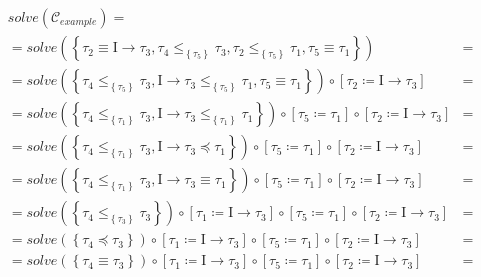 \begin{equation}
    \label{eq:consts_solve}
    \begin{aligned}
        &solve(\mathcal{C}_{example}) = \\
        &= solve(\left\{ \tau_2 \equiv \text{I} \to \tau_3, \tau_4 \leq_{\left\{ \tau_5 \right\}} \tau_3, \tau_2 \leq_{\left\{ \tau_5 \right\}} \tau_1, \tau_5 \equiv \tau_1 \right\}) &= \\
        &= solve(\left\{ \tau_4 \leq_{\left\{ \tau_5 \right\}} \tau_3, \text{I} \to \tau_3 \leq_{\left\{ \tau_5 \right\}} \tau_1, \tau_5 \equiv \tau_1 \right\}) \circ \left[ \tau_2 \coloneqq \text{I} \to \tau_3 \right] &= \\
        &= solve(\left\{ \tau_4 \leq_{\left\{ \tau_1 \right\}} \tau_3, \text{I} \to \tau_3 \leq_{\left\{ \tau_1 \right\}} \tau_1 \right\})                       \circ \left[ \tau_5 \coloneqq \tau_1 \right] \circ \left[ \tau_2 \coloneqq \text{I} \to \tau_3 \right] &= \\
        &= solve(\left\{ \tau_4 \leq_{\left\{ \tau_1 \right\}} \tau_3, \text{I} \to \tau_3 \preceq \tau_1 \right\})                                              \circ \left[ \tau_5 \coloneqq \tau_1 \right] \circ \left[ \tau_2 \coloneqq \text{I} \to \tau_3 \right] &= \\
        &= solve(\left\{ \tau_4 \leq_{\left\{ \tau_1 \right\}} \tau_3, \text{I} \to \tau_3 \equiv \tau_1 \right\})                                               \circ \left[ \tau_5 \coloneqq \tau_1 \right] \circ \left[ \tau_2 \coloneqq \text{I} \to \tau_3 \right] &= \\
        &= solve(\left\{ \tau_4 \leq_{\left\{ \tau_3 \right\}} \tau_3 \right\})                                                                                  \circ \left[ \tau_1 \coloneqq \text{I} \to \tau_3 \right] \circ \left[ \tau_5 \coloneqq \tau_1 \right] \circ \left[ \tau_2 \coloneqq \text{I} \to \tau_3 \right] &= \\
        &= solve(\left\{ \tau_4 \preceq \tau_3 \right\})                                                                                                         \circ \left[ \tau_1 \coloneqq \text{I} \to \tau_3 \right] \circ \left[ \tau_5 \coloneqq \tau_1 \right] \circ \left[ \tau_2 \coloneqq \text{I} \to \tau_3 \right] &= \\
        &= solve(\left\{ \tau_4 \equiv \tau_3 \right\})                                                                                                          \circ \left[ \tau_1 \coloneqq \text{I} \to \tau_3 \right] \circ \left[ \tau_5 \coloneqq \tau_1 \right] \circ \left[ \tau_2 \coloneqq \text{I} \to \tau_3 \right] &= \\

\end{aligned}
\end{equation}
